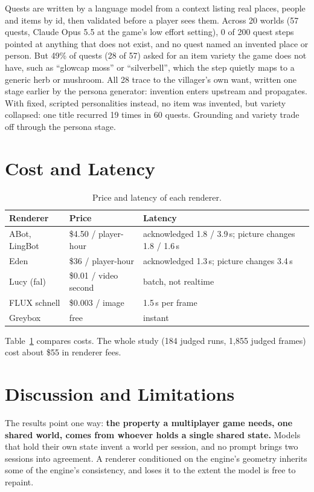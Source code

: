 \documentclass[conference]{IEEEtran}
\begin{document}
Quests are written by a language model from a context listing real places, people and items by id, then validated before a player sees them. Across 20 worlds (57 quests, Claude Opus 5.5 at the game's low effort setting), 0 of 200 quest steps pointed at anything that does not exist, and no quest named an invented place or person. But 49\% of quests (28 of 57) asked for an item variety the game does not have, such as ``glowcap moss'' or ``silverbell'', which the step quietly maps to a generic herb or mushroom. All 28 trace to the villager's own want, written one stage earlier by the persona generator: invention enters upstream and propagates. With fixed, scripted personalities instead, no item was invented, but variety collapsed: one title recurred 19 times in 60 quests. Grounding and variety trade off through the persona stage.

\section{Cost and Latency}

\begin{table}[t]
\caption{Price and latency of each renderer.}\label{tab:cost}
\centering
\footnotesize
\begin{tabular}{@{}p{1.55cm}p{2.15cm}p{3.75cm}@{}}
\toprule
Renderer & Price & Latency \\
\midrule
ABot, LingBot & \$4.50 / player-hour & acknowledged 1.8 / 3.9\,s; picture changes 1.8 / 1.6\,s \\
Eden & \$36 / player-hour & acknowledged 1.3\,s; picture changes 3.4\,s \\
Lucy (fal) & \$0.01 / video second & batch, not realtime \\
FLUX schnell & \$0.003 / image & 1.5\,s per frame \\
Greybox & free & instant \\
\bottomrule
\end{tabular}
\end{table}

Table~\ref{tab:cost} compares costs. The whole study (184 judged runs, 1,855 judged frames) cost about \$55 in renderer fees.

\section{Discussion and Limitations}

The results point one way: \textbf{the property a multiplayer game needs, one shared world, comes from whoever holds a single shared state.} Models that hold their own state invent a world per session, and no prompt brings two sessions into agreement. A renderer conditioned on the engine's geometry inherits some of the engine's consistency, and loses it to the extent the model is free to repaint.
\end{document}
